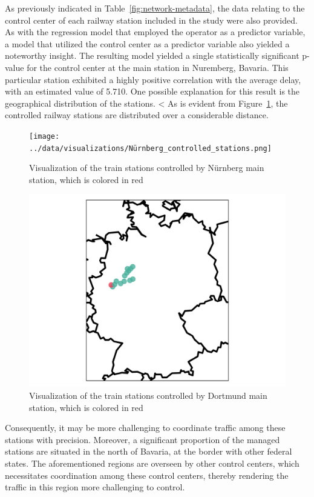 \documentclass[12pt,a4paper]{article}
\begin{document}
As previously indicated in Table~\ref{fig:network-metadata}, the data relating to the control center of each railway station included in the study were also provided.
As with the regression model that employed the operator as a predictor variable, a model that utilized the control center as a predictor variable also yielded a noteworthy insight.
The resulting model yielded a single statistically significant p-value for the control center at the main station in Nuremberg, Bavaria.
This particular station exhibited a highly positive correlation with the average delay, with an estimated value of 5.710. 
One possible explanation for this result is the geographical distribution of the stations. <
As is evident from Figure~\ref{fig:nb-control}, the controlled railway stations are distributed over a considerable distance. 

\begin{figure}[h]
  \texttt{[image: ../data/visualizations/Nürnberg\_controlled\_stations.png]}
  \caption{Visualization of the train stations controlled by Nürnberg main station, which is colored in red}
   \label{fig:nb-control}
\end{figure}

\begin{figure}[h]
  \includegraphics[clip=true,width=\columnwidth]{../data/visualizations/Dortmund_controlled_stations.png}
  \caption{Visualization of the train stations controlled by Dortmund main station, which is colored in red}
   \label{fig:do-control}
\end{figure}

Consequently, it may be more challenging to coordinate traffic among these stations with precision. 
Moreover, a significant proportion of the managed stations are situated in the north of Bavaria, at the border with other federal states. 
The aforementioned regions are overseen by other control centers, which necessitates coordination among these control centers, thereby rendering the traffic in this region more challenging to control.
\end{document}
